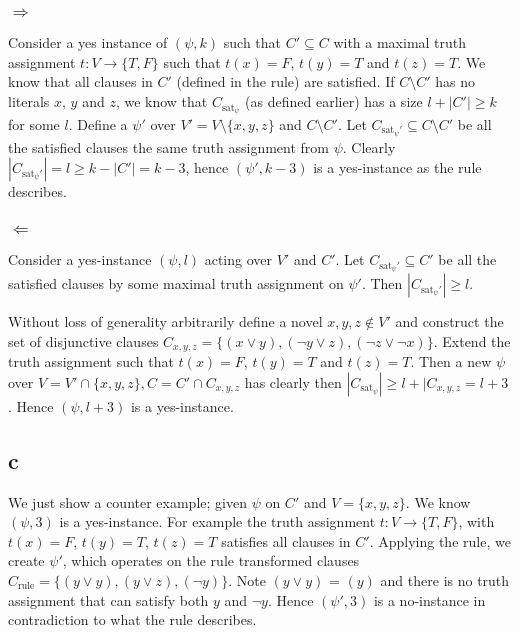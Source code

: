 \documentclass{article}
\begin{document}
\subsubsection*{$\Rightarrow$}
Consider a yes instance of $(\psi, k)$ such that $C' \subseteq C$ with a maximal truth assignment $t: V \rightarrow \{T,F\}$ such that $t(x)=F$, $t(y)=T$ and $t(z)=T$. We know that all clauses in $C'$ (defined in the rule) are satisfied. If $C \setminus C'$ has no literals $x$, $y$ and $z$, we know that $C_{\text{sat}_\psi}$ (as defined earlier) has a size $ l + |C'| \geq k$ for some $l$. Define a $\psi'$ over $V' = V \setminus \{x,y,z\}$ and $C \setminus C'$. Let $C_{\text{sat}_\psi'} \subseteq C\setminus C'$ be all the satisfied clauses the same truth assignment from $\psi$. Clearly $|C_{\text{sat}_\psi'}| = l \geq k - |C'| = k - 3$, hence $(\psi', k - 3)$ is a yes-instance as the rule describes.

\subsubsection*{$\Leftarrow$}
Consider a yes-instance $(\psi, l)$ acting over $V'$ and $C'$. Let $C_{\text{sat}_\psi'} \subseteq C'$ be all the satisfied clauses by some maximal truth assignment on $\psi'$. Then $|C_{\text{sat}_\psi'}| \geq l$.

Without loss of generality arbitrarily define a novel $x,y,z \not\in V'$ and construct the set of disjunctive clauses $C_{x,y,z} = \{(x \lor y), (\neg y \lor z), (\neg z \lor \neg x)\}$. Extend the truth assignment such that $t(x)=F$, $t(y)=T$ and $t(z)=T$. Then a new $\psi$ over $V = V' \cap \{x,y,z\}, C = C' \cap C_{x,y,z}$ has clearly then $|C_{\text{sat}_\psi}| \geq l + |C_{x,y,z} = l + 3$. Hence $(\psi, l + 3)$ is a yes-instance.

\subsection*{c}
We just show a counter example; given $\psi$ on $C'$ and $V = \{x,y,z\}$. We know $(\psi, 3)$ is a yes-instance. For example the truth assignment $t: V \rightarrow\{T,F\}$, with $t(x)=F$, $t(y)=T$, $t(z)=T$ satisfies all clauses in $C'$. Applying the rule, 
we create $\psi'$, which operates on the rule transformed clauses $C_{\text{rule}}=\{(y \lor y), (y \lor z), (\lnot y)\}$. Note $(y \lor y)$ = $(y)$ and there is no truth assignment that can satisfy both $y$ and $\lnot y$. Hence $(\psi', 3)$ is a no-instance in contradiction to what the rule describes.
\end{document}
